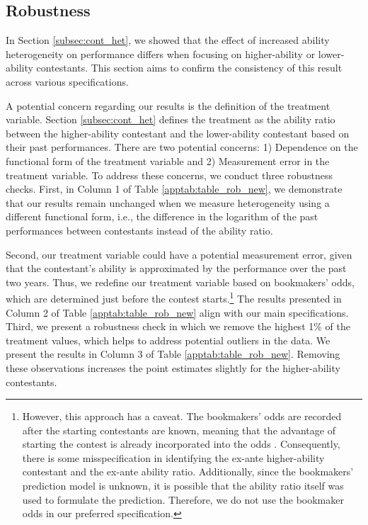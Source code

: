 \documentclass[11pt,a4paper]{article}
\begin{document}
 \newpage

\subsection{Robustness}\label{subsec:app_robust}

In Section \ref{subsec:cont_het}, we showed that the effect of increased ability heterogeneity on performance differs when focusing on higher-ability or lower-ability contestants. This section aims to confirm the consistency of this result across various specifications.\par

A potential concern regarding our results is the definition of the treatment variable. Section \ref{subsec:cont_het} defines the treatment as the ability ratio between the higher-ability contestant and the lower-ability contestant based on their past performances. There are two potential concerns: 1) Dependence on the functional form of the treatment variable and 2) Measurement error in the treatment variable. To address these concerns, we conduct three robustness checks. First, in Column 1 of Table \ref{apptab:table_rob_new}, we demonstrate that our results remain unchanged when we measure heterogeneity using a different functional form, i.e., the difference in the logarithm of the past performances between contestants instead of the ability ratio.\par

Second, our treatment variable could have a potential measurement error, given that the contestant's ability is approximated by the performance over the past two years.
Thus, we redefine our treatment variable based on bookmakers' odds, which are determined just before the contest starts.\footnote{However, this approach has a caveat. The bookmakers' odds are recorded after the starting contestants are known, meaning that the advantage of starting the contest is already incorporated into the odds \cite{Goller.2023}. Consequently, there is some misspecification in identifying the ex-ante higher-ability contestant and the ex-ante ability ratio. Additionally, since the bookmakers' prediction model is unknown, it is possible that the ability ratio itself was used to formulate the prediction. Therefore, we do not use the bookmaker odds in our preferred specification.} The results presented in Column 2 of Table \ref{apptab:table_rob_new} align with our main specifications. Third, we present a robustness check in which we remove the highest 1\% of the treatment values, which helps to address potential outliers in the data. We present the results in Column 3 of Table \ref{apptab:table_rob_new}. Removing these observations increases the point estimates slightly for the higher-ability contestants.\par 
\end{document}
